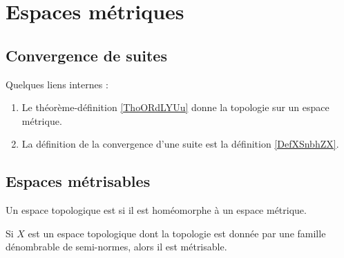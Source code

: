 
\section{Espaces métriques}

\subsection{Convergence de suites}

Quelques liens internes :
\begin{enumerate}
    \item
Le théorème-définition \ref{ThoORdLYUu} donne la topologie sur un espace métrique.
\item
    La définition de la convergence d'une suite est la définition \ref{DefXSnbhZX}. 
\end{enumerate}

\subsection{Espaces métrisables}

\begin{definition}
    Un espace topologique est  si il est homéomorphe à un espace métrique.
\end{definition}

\begin{proposition}
    Si \( X\) est un espace topologique dont la topologie est donnée par une famille dénombrable de semi-normes, alors il est métrisable.
\end{proposition}

